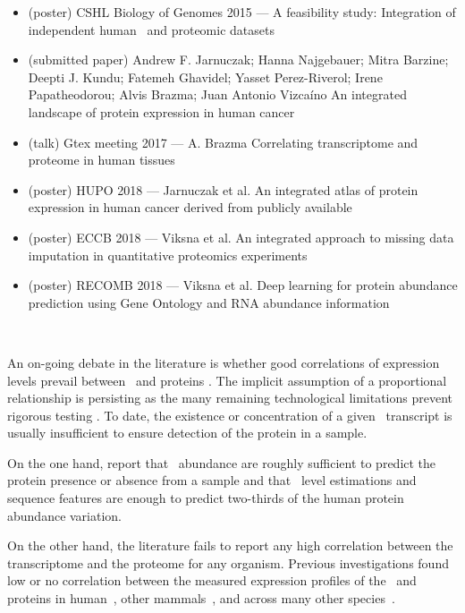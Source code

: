 \derivativeWork{}
\begin{itemize}[topsep=0pt,nosep]
    \item (poster) CSHL  Biology of Genomes 2015 --- A feasibility study:
        Integration of independent human \Rnaseq\ and proteomic datasets
    \item (submitted paper) Andrew F. Jarnuczak; Hanna Najgebauer; Mitra Barzine;
        Deepti J. Kundu; Fatemeh Ghavidel; Yasset Perez-Riverol; Irene Papatheodorou; Alvis Brazma;
        Juan Antonio Vizcaíno An integrated landscape of protein expression in human cancer
    \item (talk) Gtex meeting 2017 --- A. Brazma Correlating transcriptome
        and proteome in human tissues
    \item (poster) HUPO 2018 --- Jarnuczak et al. An integrated atlas of
        protein expression in human cancer derived from publicly available
    \item (poster) ECCB 2018 --- Viksna et al. An integrated approach
        to missing data imputation in quantitative proteomics experiments
    \item (poster) RECOMB 2018 --- Viksna et al. Deep learning
        for protein abundance prediction using Gene Ontology and RNA abundance information
\end{itemize}

\clearpage\

\vspace{-1cm}

An on-going debate in the literature is
whether good correlations of expression levels prevail
between \mRNAs\ and proteins .
The implicit assumption of a proportional relationship is persisting
as the many remaining technological limitations prevent
rigorous testing .
To date, the existence or concentration of a given \mRNA\ transcript
is usually insufficient to ensure detection of the protein in a sample.\mybr\

On the one hand,
\citet{Ramakrishnan2009-lv} report that
\mRNAs\ abundance are roughly sufficient to predict
the protein presence or absence from a sample and
\citet{Vogel2010-ux} that
\mRNA\ level estimations and sequence features are enough to predict
two-thirds of the human protein abundance variation.\\
\vspace{-\baselineskip}

On the other hand,
the literature fails to report any high correlation
between the transcriptome and the proteome for any organism.
Previous investigations found low or no correlation
between the measured expression profiles of the \mRNAs\ and
proteins in human~,
other mammals~,
and across many other species~.

